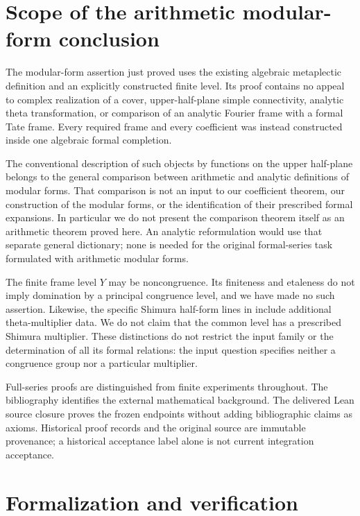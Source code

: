 \documentclass[11pt]{article}
\theoremstyle{remark}\newtheorem{remark}[theorem]{Remark}
\begin{document}
\section{Scope of the arithmetic modular-form conclusion}\label{scope}
The modular-form assertion just proved uses the existing algebraic
metaplectic definition and an explicitly constructed finite level.
Its proof contains no appeal to complex realization of a cover,
upper-half-plane simple connectivity, analytic theta transformation,
or comparison of an analytic Fourier frame with a formal Tate frame.
Every required frame and every coefficient was instead constructed
inside one algebraic formal completion.

The conventional description of such objects by functions on the
upper half-plane belongs to the general comparison between arithmetic
and analytic definitions of modular forms. That comparison is not an
input to our coefficient theorem, our construction of the modular
forms, or the identification of their prescribed formal expansions.
In particular we do not present the comparison theorem itself as an
arithmetic theorem proved here. An analytic reformulation would use
that separate general dictionary; none is needed for the original
formal-series task formulated with arithmetic modular forms.

The finite frame level $Y$ may be noncongruence. Its finiteness and
etaleness do not imply domination by a principal congruence level,
and we have made no such assertion. Likewise, the specific Shimura
half-form lines in \cite[Definitions 3.4.1 and 3.4.4]{candelori}
include additional theta-multiplier data. We do not claim that the
common level has a prescribed Shimura multiplier. These distinctions
do not restrict the input family or the determination of all its
formal relations: the input question specifies neither a congruence
group nor a particular multiplier.

Full-series proofs are distinguished from finite experiments throughout.
The bibliography identifies the external mathematical background. The delivered
Lean source closure proves the frozen endpoints without adding bibliographic
claims as axioms. Historical proof records and the original source are immutable
provenance; a historical acceptance label alone is not current integration
acceptance.


\section{Formalization and verification}\label{formalization}
\end{document}
